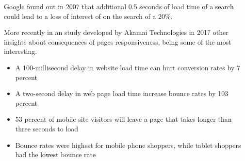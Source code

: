 \documentclass[../main.tex]{subfiles}
\begin{document}
Google found out in 2007 that additional 0.5 seconds of load time of a search could lead to a loss of interest of on the search of a 20\%. %

More recently in an study developed by Akamai Technologies in 2017 other insights about consequences of pages responsiveness, being some of the most interesting.

\begin{itemize}
    \item A 100-millisecond delay in website load time can hurt conversion rates by 7 percent 

    \item A two-second delay in web page load time increase bounce rates by 103 percent

    \item 53 percent of mobile site visitors will leave a page that takes longer than three seconds to load
    
    \item Bounce rates were highest for mobile phone shoppers, while tablet shoppers had the lowest bounce rate
\end{itemize}
\end{document}
